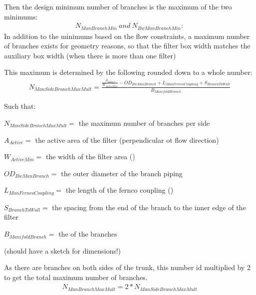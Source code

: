 \documentclass[letterpaper,10pt,english]{sphinxmanual}
\begin{document}
Then the design minimum number of branches is the maximum of the two minimums:
\begin{equation}\label{equation:Filtration/Filtration_Derivations:Filtration/Filtration_Derivations:30}
\begin{split}N_{ManBranchMin} \ and \ N_{BwManBranchMin}:\end{split}
\end{equation}
In addition to the minimums based on the flow constraints, a maximum number of branches exists for geometry reasons, so that the filter box width matches the auxiliary box width (when there is more than one filter)

This maximum is determined by the following rounded down to a whole number:
\begin{equation}\label{equation:Filtration/Filtration_Derivations:Filtration/Filtration_Derivations:31}
\begin{split}N_{ManSideBranchMaxMult} = \frac{\frac{A_{Active}}{W_{ActiveMin}} - OD_{BwManBranch} + L_{ManFerncoCoupling} + S_{BranchToWall}}{B_{ManifoldBranch}}\end{split}
\end{equation}
\begin{DUlineblock}{0em}
\item[] Such that:
\item[] \(N_{ManSideBranchMaxMult} =\) the maximum number of branches per side
\item[] \(A_{Active} =\) the active area of the filter (perpendicular ot flow direction)
\item[] \(W_{ActiveMin} =\) the width of the filter area ()
\item[] \(OD_{BwManBranch} =\) the outer diameter of the branch piping
\item[] \(L_{ManFerncoCoupling} =\) the length of the fernco coupling ()
\item[] \(S_{BranchToWall} =\) the spacing from the end of the branch to the inner edge of the filter
\item[] \(B_{ManifoldBranch} =\) the  of the branches
\end{DUlineblock}

(should have a sketch for dimensions!)

As there are branches on both sides of the trunk, this number id multiplied by 2 to get the total maximum number of branches.
\begin{equation}\label{equation:Filtration/Filtration_Derivations:Filtration/Filtration_Derivations:32}
\begin{split}N_{ManBranchMaxMult} = 2*N_{ManSideBranchMaxMult}\end{split}
\end{equation}
\end{document}
